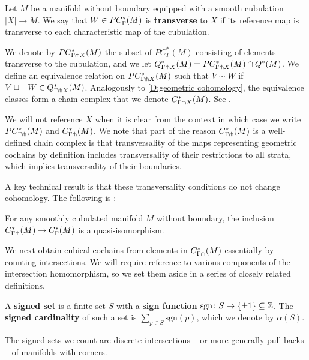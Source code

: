 \begin{definition}
	Let $M$ be a manifold without boundary equipped with a smooth cubulation $|X| \to M$.
	We say that $W \in PC_\Gamma^*(M)$ is \textbf{transverse} to $X$ if its reference map is transverse to each characteristic map of the cubulation.

	We denote by $PC^*_{\Gamma \pitchfork X}(M)$ the subset of $PC_\Gamma^*(M)$ consisting of elements transverse to the cubulation, and we let $Q^*_{\Gamma \pitchfork X}(M) = PC^*_{\Gamma \pitchfork X}(M) \cap Q^*(M)$.
	We define an equivalence relation on $PC^*_{\Gamma \pitchfork X}(M)$ such that $V \sim W$ if $V \sqcup -W \in Q^*_{\Gamma \pitchfork X}(M)$.
	Analogously to \cref{D:geometric cohomology}, the equivalence classes form a chain complex that we denote $C^*_{\Gamma \pitchfork X}(M)$.
	See \cite[Section 6.4]{medina2022foundations}.
\end{definition}

We will not reference $X$ when it is clear from the context in which case we write $PC_{\Gamma \pitchfork}^*(M)$ and $C^*_{\Gamma \pitchfork}(M)$.
We note that part of the reason $C^*_{\Gamma \pitchfork}(M)$ is a well-defined chain complex is that transversality of the maps representing geometric cochains by definition includes transversality of their restrictions to all strata, which implies transversality of their boundaries.

A key technical result is that these transversality conditions do not change cohomology.
The following is \cite[Theorem 6.5]{medina2022foundations}:

\begin{theorem}\label{T:transverse complex}
	For any smoothly cubulated manifold $M$ without boundary, the inclusion $C^*_{\Gamma \pitchfork}(M) \to C^*_\Gamma(M)$ is a quasi-isomorphism.
\end{theorem}

We next obtain cubical cochains from elements in $C^*_{\Gamma \pitchfork}(M)$ essentially by counting intersections.
We will require reference to various components of the intersection homomorphism, so we set them aside in a series of closely related definitions.

\begin{definition}
	A \textbf{signed set} is a finite set $S$ with a \textbf{sign function} $\mathrm{sgn} \colon S \to \{\pm 1\} \subseteq \mathbb{Z}$.
	The \textbf{signed cardinality} of such a set is $\sum_{p \in S} \mathrm{sgn}(p)$, which we denote by $\alpha(S)$.
\end{definition}

The signed sets we count are discrete intersections -- or more generally pull-backs -- of manifolds with corners.

